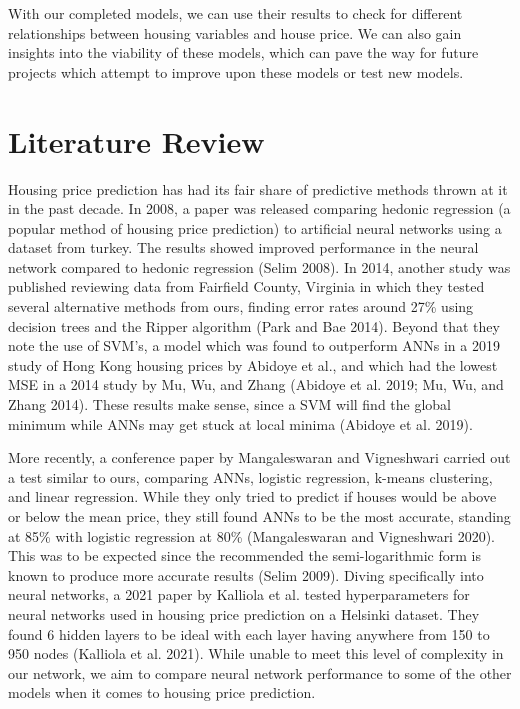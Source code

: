 \documentclass[a4paper]{article}
\begin{document}
	With our completed models, we can use their results to check for different relationships between housing variables and house price. We can also gain insights into the viability of these models, which can pave the way for future projects which attempt to improve upon these models or test new models.
	
	\section{Literature Review}
		
	Housing price prediction has had its fair share of predictive methods thrown at it in the past decade. In 2008, a paper was released comparing hedonic regression (a popular method of housing price prediction) to artificial neural networks using a dataset from turkey. The results showed improved performance in the neural network compared to hedonic regression (Selim 2008). In 2014, another study was published reviewing data from Fairfield County, Virginia in which they tested several alternative methods from ours, finding error rates around 27\% using decision trees and the Ripper algorithm (Park and Bae 2014). Beyond that they note the use of SVM’s, a model which was found to outperform ANNs in a 2019 study of Hong Kong housing prices by Abidoye et al., and which had the lowest MSE in a 2014 study by Mu, Wu, and Zhang (Abidoye et al. 2019; Mu, Wu, and Zhang 2014). These results make sense, since a SVM will find the global minimum while ANNs may get stuck at local minima (Abidoye et al. 2019).
	
	More recently, a conference paper by Mangaleswaran and Vigneshwari carried out a test similar to ours, comparing ANNs, logistic regression, k-means clustering, and linear regression. While they only tried to predict if houses would be above or below the mean price, they still found ANNs to be the most accurate, standing at 85\% with logistic regression at 80\% (Mangaleswaran and Vigneshwari 2020). This was to be expected since the recommended the semi-logarithmic form is known to produce more accurate results (Selim 2009). Diving specifically into neural networks, a 2021 paper by Kalliola et al. tested hyperparameters for neural networks used in housing price prediction on a Helsinki dataset. They found 6 hidden layers to be ideal with each layer having anywhere from 150 to 950 nodes (Kalliola et al. 2021). While unable to meet this level of complexity in our network, we aim to compare neural network performance to some of the other models when it comes to housing price prediction.
	
\end{document}

